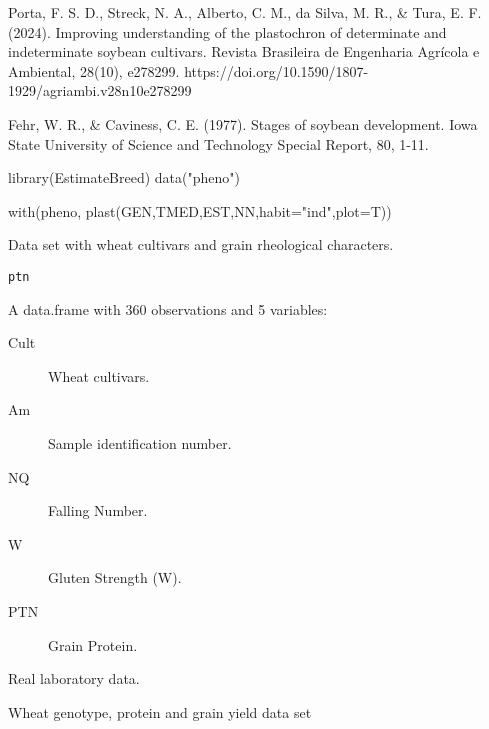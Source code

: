 \documentclass[a4paper]{book}
\begin{document}
%
\begin{References}
Porta, F. S. D., Streck, N. A., Alberto, C. M., da Silva, M. R.,
\& Tura, E. F. (2024). Improving understanding of the plastochron of
determinate and indeterminate soybean cultivars. Revista Brasileira de
Engenharia Agrícola e Ambiental, 28(10), e278299.
https://doi.org/10.1590/1807-1929/agriambi.v28n10e278299

Fehr, W. R., \& Caviness, C. E. (1977). Stages of soybean development.
Iowa State University of Science and Technology Special Report, 80, 1-11.
\end{References}
%
\begin{Examples}
\begin{ExampleCode}

library(EstimateBreed)
data("pheno")

with(pheno, plast(GEN,TMED,EST,NN,habit="ind",plot=T))

\end{ExampleCode}
\end{Examples}
%
\begin{Description}
Data set with wheat cultivars and grain rheological characters.
\end{Description}
%
\begin{Usage}
\begin{verbatim}
ptn
\end{verbatim}
\end{Usage}
%
\begin{Format}
A data.frame with 360 observations and 5 variables:
\begin{description}

\item[Cult] Wheat cultivars.
\item[Am] Sample identification number.
\item[NQ] Falling Number.
\item[W] Gluten Strength (W).
\item[PTN] Grain Protein.

\end{description}

\end{Format}
%
\begin{Source}
Real laboratory data.
\end{Source}
%
\begin{Description}
Wheat genotype, protein and grain yield data set
\end{Description}
\end{document}
